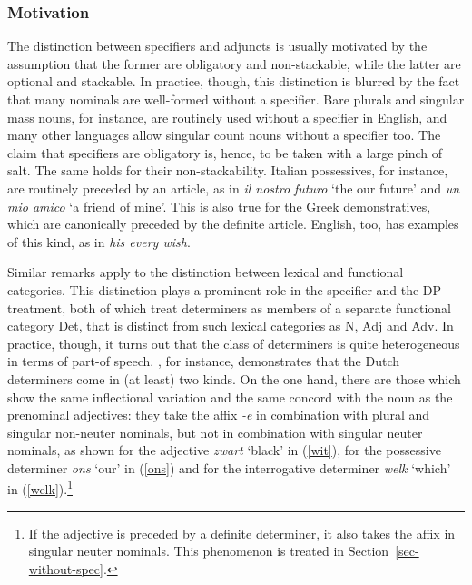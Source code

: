 \documentclass[output=paper
	        ,collection
	        ,collectionchapter
 	        ,biblatex
                ,babelshorthands
                ,newtxmath
                ,draftmode
                ,colorlinks, citecolor=brown
]{langscibook}
\begin{document}
\subsubsection{Motivation} 
\label{motiv}


The distinction between specifiers and adjuncts is usually motivated by 
the assumption that the former are obligatory and non-stackable, while the latter  
are optional and stackable. In practice, though, this distinction 
is blurred by the fact that many nominals are well-formed without a specifier.
Bare plurals and singular mass nouns, for instance, are routinely used without a 
specifier in English, and many other languages allow singular count nouns without 
a specifier too. The claim that specifiers are obligatory is, hence, to be taken 
with a large pinch of salt. The same holds for their non-stackability. 
Italian possessives, for instance, are routinely preceded by an article, as in 
\emph{il nostro futuro} `the our future' and \emph{un mio amico} `a friend of mine'.     
This is also true for the Greek demonstratives, which are canonically preceded by the 
definite article. English, too, has examples of this kind, as in \emph{his every wish}.    

Similar remarks apply to the distinction between lexical and functional categories. 
This distinction plays a prominent role in the specifier and the DP treatment, both of which treat 
determiners as members of a separate functional category Det, that is distinct from 
such lexical categories as N, Adj and Adv.
In practice, though, it turns out that the class of determiners is quite heterogeneous in 
terms of part-of speech. \citet{VanEynde06}, for instance, demonstrates that the 
Dutch determiners come in (at least) two kinds. On the one hand, there are those 
which show the same inflectional variation and the same concord with the noun as the 
prenominal adjectives: they take the affix \emph{-e} in combination with plural 
and singular non-neuter nominals, but not in combination with singular 
neuter nominals, as shown for the adjective \emph{zwart} `black' in (\ref{wit}), 
for the possessive determiner \emph{ons} `our' in (\ref{ons}) and for the 
interrogative determiner \emph{welk} `which' in (\ref{welk}).\footnote{If the adjective 
is preceded by a definite determiner, 
it also takes the affix in singular neuter nominals. This phenomenon is treated 
in Section~\ref{sec-without-spec}.} 
\end{document}
